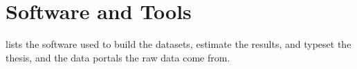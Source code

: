 \section{Software and Tools}
\label{app:software-tools}

 lists the software used to build the datasets, estimate the results, and typeset the thesis, and the data portals the raw data come from.



